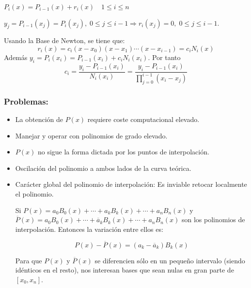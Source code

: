 \documentclass[twoside]{report}
\newcommand{\colocapdf}[2]{\quad\pdfimage width #2 {pdfs/#1.pdf}}
\begin{document}
\begin{defi}
$P_i(x)=P_{i-1}(x)+r_i(x) \quad 1\leq i\leq n$
\end{defi}

\vspace{0.3cm}

$y_j=P_{i-1}(x_j)=P_i(x_j), \; 0\leq j\leq i-1 \Rightarrow r_i(x_j)=0,\; 0\leq j\leq i-1.$

Usando la Base de Newton, se tiene que:
$$r_i(x)=c_i(x-x_0)(x-x_1)\cdots (x-x_{i-1})=c_iN_i(x)$$
Adem\'{a}s $y_i=P_i(x_i)=P_{i-1}(x_i)+c_i N_i(x_i).$ Por tanto
$$c_i=\frac{y_i-P_{i-1}(x_i)}{N_i(x_i)}=\frac{y_i-P_{i-1}(x_i)}{\prod_{j=0}^{i-1} (x_i-x_j)}$$

\subsubsection{Problemas:}

\begin{itemize}
\item La obtenci\'{o}n de $P(x)$ requiere coste computacional elevado.
\item Manejar y operar con polinomios de grado elevado.
\item $P(x)$ no sigue la forma dictada por los puntos de interpolaci\'{o}n.


\item Oscilaci\'{o}n del polinomio a ambos lados de la curva te\'{o}rica.

\item Car\'{a}cter global del polinomio de interpolaci\'{o}n: Es inviable retocar localmente el polinomio.


Si $P(x)= a_0 B_0(x)+\cdots+a_kB_k(x)+\cdots +a_n B_n(x)$ y $\overline{P}(x)= a_0 B_0(x)+\cdots+\overline{a}_kB_k(x)+\cdots +a_n B_n(x)$ son los polinomios de interpolaci\'{o}n. Entonces la variaci\'{o}n entre ellos es:

$$P(x)-\overline{P}(x)= (a_k-\overline{a}_k) B_k(x)$$

Para que $P(x)$ y $\overline{P}(x)$ se diferencien s\'{o}lo en un peque\~{n}o intervalo (siendo id\'{e}nticos en el resto), nos interesan bases que sean nulas en gran parte de $[x_0,x_n]$.
\end{itemize}
\end{document}
